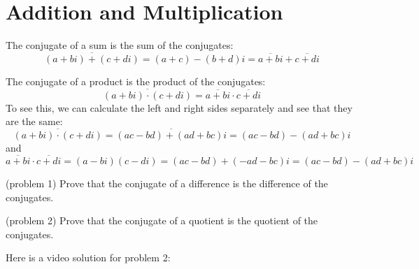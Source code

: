 \documentclass[handout]{ximera}
\begin{document}
\section{Addition and Multiplication}

The conjugate of a sum is the sum of the conjugates:
\[
\overline{(a+bi) + (c+di)} = (a+c) - (b+d)i = \overline{a+bi }+\overline{c+di}
\]


The conjugate of a product is the product of the conjugates:
\[
\overline{(a+bi) \cdot (c+di)} = \overline{a+bi }\cdot\overline{c+di}
\]
To see this, we can calculate the left and right sides separately and see that they are the same:
\[
\overline{(a+bi) \cdot (c+di)}= \overline{(ac-bd) + (ad+bc)i} = (ac-bd) - (ad+bc)i
\]
and
\[
\overline{a+bi }\cdot\overline{c+di} = (a-bi)(c-di) = (ac-bd) + (-ad-bc)i = (ac-bd) - (ad +bc)i
\]


\begin{problem}(problem 1) 
Prove that the conjugate of a difference is the difference of the conjugates.
\end{problem}


\begin{problem}(problem 2) 
Prove that the conjugate of a quotient is the quotient of the conjugates.
\end{problem}

Here is a video solution for problem 2:\\
\begin{foldable}
\end{foldable}
\end{document}
